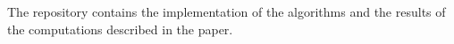 
The repository contains the implementation of the algorithms and the results of the computations described in the paper.\\
